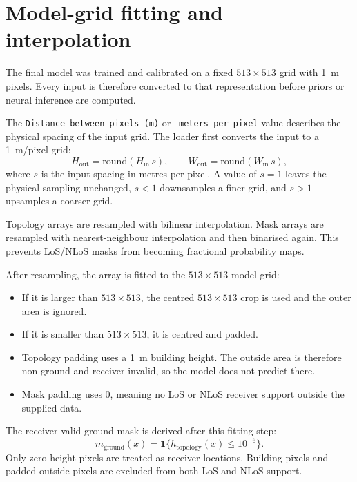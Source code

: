 \section{Model-grid fitting and interpolation}

The final model was trained and calibrated on a fixed \(513\times513\) grid with
\SI{1}{m} pixels. Every input is therefore converted to that representation
before priors or neural inference are computed.

The \texttt{Distance between pixels (m)} or \texttt{--meters-per-pixel} value
describes the physical spacing of the input grid. The loader first converts the
input to a \SI{1}{m}/pixel grid:
\begin{equation}
  H_{\mathrm{out}} = \mathrm{round}(H_{\mathrm{in}}\,s),
  \qquad
  W_{\mathrm{out}} = \mathrm{round}(W_{\mathrm{in}}\,s),
\label{eq:generator_grid_resampling}
\end{equation}
where \(s\) is the input spacing in metres per pixel. A value of
\(s=1\) leaves the physical sampling unchanged, \(s<1\) downsamples a finer
grid, and \(s>1\) upsamples a coarser grid.

Topology arrays are resampled with bilinear interpolation. Mask arrays are
resampled with nearest-neighbour interpolation and then binarised again. This
prevents LoS/NLoS masks from becoming fractional probability maps.

After resampling, the array is fitted to the \(513\times513\) model grid:

\begin{itemize}
\setlength\itemsep{0.15em}
  \item If it is larger than \(513\times513\), the centred \(513\times513\)
        crop is used and the outer area is ignored.
  \item If it is smaller than \(513\times513\), it is centred and padded.
  \item Topology padding uses a \SI{1}{m} building height. The outside area
        is therefore non-ground and receiver-invalid, so the model does not
        predict there.
  \item Mask padding uses 0, meaning no LoS or NLoS receiver support outside
        the supplied data.
\end{itemize}

The receiver-valid ground mask is derived after this fitting step:
\begin{equation}
  m_{\mathrm{ground}}(x) =
  \mathbf{1}\{h_{\mathrm{topology}}(x) \le 10^{-6}\}.
\label{eq:generator_ground_mask}
\end{equation}
Only zero-height pixels are treated as receiver locations. Building pixels and
padded outside pixels are excluded from both LoS and NLoS support.

